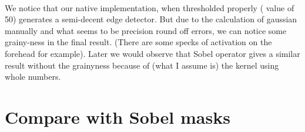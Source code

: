 \documentclass[11pt]{article}
\begin{document}
    \begin{center}
    \end{center}
    { \hspace*{\fill} \\}
    
    We notice that our native implementation, when thresholded properly (
value of 50) generates a semi-decent edge detector. But due to the
calculation of gaussian manually and what seems to be precision round
off errors, we can notice some grainy-ness in the final result. (There
are some specks of activation on the forehead for example). Later we
would observe that Sobel operator gives a similar result without the
grainyness because of (what I assume is) the kernel using whole numbers.

    \hypertarget{compare-with-sobel-masks}{%
\section{Compare with Sobel masks}\label{compare-with-sobel-masks}}
\end{document}
